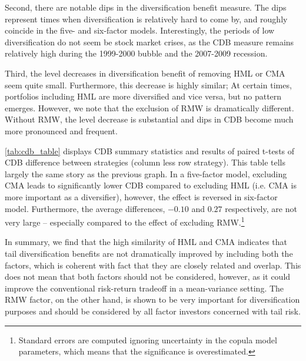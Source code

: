 Second, there are notable dips in the diversification benefit measure. The dips represent times when diversification is relatively hard to come by, and roughly coincide in the five- and six-factor models. Interestingly, the periods of low diversification do not seem be stock market crises, as the CDB measure remains relatively high during the 1999-2000 bubble and the 2007-2009 recession.

Third, the level decreases in diversification benefit of removing HML or CMA seem quite small. Furthermore, this decrease is highly similar; At certain times, portfolios including HML are more diversified and vice versa, but no pattern emerges. However, we note that the exclusion of RMW is dramatically different. Without RMW, the level decrease is substantial and dips in CDB become much more pronounced and frequent.



\autoref{tab:cdb_table} displays CDB summary statistics and results of paired t-tests of CDB difference between strategies (column less row strategy). This table tells largely the same story as the previous graph. In a five-factor model, excluding CMA leads to significantly lower CDB compared to excluding HML (i.e. CMA is more important as a diversifier), however, the effect is reversed in six-factor model. Furthermore, the average differences, $-0.10$ and $0.27$ respectively, are not very large -- especially compared to the effect of excluding RMW.\footnote{Standard errors are computed ignoring uncertainty in the copula model parameters, which means that the significance is overestimated.}


In summary, we find that the high similarity of HML and CMA indicates that tail diversification benefits are not dramatically improved by including both the factors, which is coherent with fact that they are closely related and overlap. This does not mean that both factors should not be considered, however, as it could improve the conventional risk-return tradeoff in a mean-variance setting. The RMW factor, on the other hand, is shown to be very important for diversification purposes and should be considered by all factor investors concerned with tail risk.





